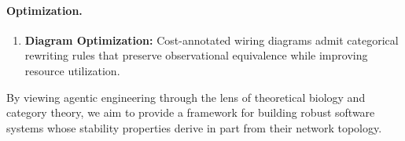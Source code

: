 \paragraph{Optimization.}
\begin{enumerate}[leftmargin=*,resume]
\item \textbf{Diagram Optimization:} Cost-annotated wiring diagrams admit categorical rewriting
rules that preserve observational equivalence while improving resource utilization.
\end{enumerate}

By viewing agentic engineering through the lens of theoretical biology and category theory, we aim to provide a
framework for building robust software systems whose stability properties derive in part from their network topology.
